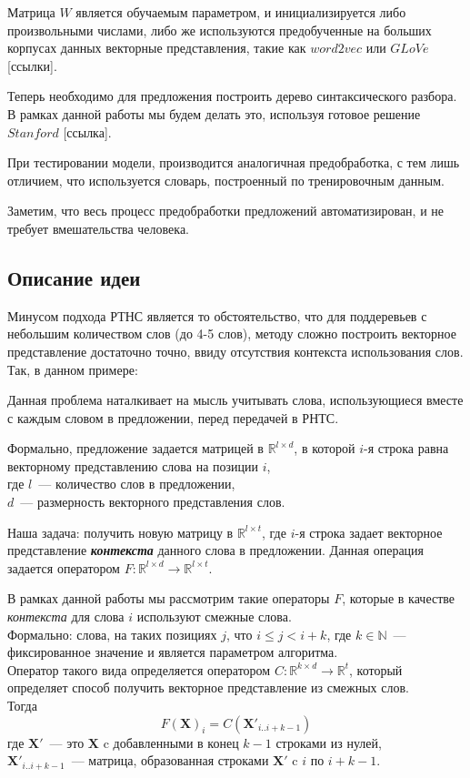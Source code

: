 Матрица $W$ является обучаемым параметром, и инициализируется либо произвольными числами, 
либо же используются предобученные на больших корпусах данных векторные представления, 
такие как $word2vec$ или $GLoVe$ [ссылки].

Теперь необходимо для предложения построить дерево синтаксического разбора.
В рамках данной работы мы будем делать это, используя готовое решение $Stanford$ [ссылка].

При тестировании модели, производится аналогичная предобработка, 
с тем лишь отличием, что используется словарь, построенный по тренировочным данным.

Заметим, что весь процесс предобработки предложений автоматизирован, 
и не требует вмешательства человека.

\subsection{Описание идеи }
Минусом подхода РТНС является то обстоятельство, что для поддеревьев с небольшим количеством слов (до 4-5 слов), методу сложно построить векторное представление достаточно точно, 
ввиду отсутствия контекста использования слов. Так, в данном примере:


Данная проблема наталкивает на мысль учитывать слова, использующиеся вместе с каждым словом в предложении, перед передачей в РНТС.

Формально, предложение задается матрицей в  $\mathbb{R}^{l \times{} d}$, в которой $i$-я строка равна векторному представлению слова на позиции $i$,\\
где $l$~--- количество слов в предложении,\\
$d$~--- размерность векторного представления слов. 

Наша задача: получить новую матрицу в $\mathbb{R}^{l \times {} t}$, где $i$-я строка задает векторное представление \textbf{\textit{контекста}} данного слова в предложении. 
Данная операция задается оператором $F:\mathbb{R}^{l \times d} \to \mathbb{R}^{l \times t}$.

В рамках данной работы мы рассмотрим такие операторы $F$, которые в качестве \textit{контекста} 
для слова $i$ используют смежные слова.\\
Формально: слова, на таких позициях $j$, что $i \le j < i + k$, где $k \in \mathbb{N}$~--- фиксированное значение и является параметром алгоритма.\\Оператор такого вида определяется оператором
$C:\mathbb{R}^{k \times d} \to \mathbb{R}^t$, который определяет способ 
получить векторное представление из смежных слов. \\
Тогда $$F(\pmb{X})_i = C(\pmb{X}'_{i..i+k-1})$$
где $\textbf{X}'$~--- это $\textbf{X}$ c добавленными в конец $k-1$ строками из нулей, \\
$\pmb{X}'_{i..i+k-1}$~--- матрица, образованная строками $\pmb{X}'$ c $i$ по $i+k-1$.\par


